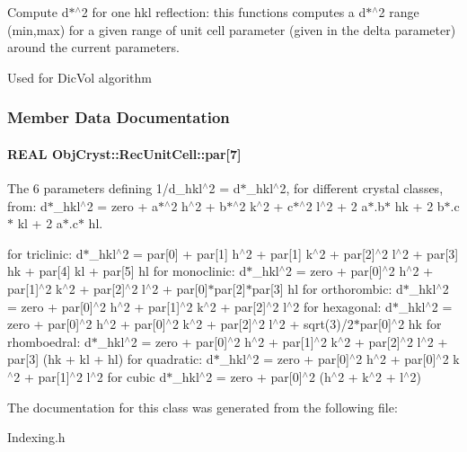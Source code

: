 \-Compute d$\ast$$^\wedge$2 for one hkl reflection\-: this functions computes a d$\ast$$^\wedge$2 range (min,max) for a given range of unit cell parameter (given in the delta parameter) around the current parameters. 

\-Used for \-Dic\-Vol algorithm 

\subsubsection{\-Member \-Data \-Documentation}
\paragraph[{par}]{\setlength{\rightskip}{0pt plus 5cm}\-R\-E\-A\-L {\bf \-Obj\-Cryst\-::\-Rec\-Unit\-Cell\-::par}[7]}\label{a00070_a624fa31d8c012440df7a3d7637dae182}


\-The 6 parameters defining 1/d\-\_\-hkl$^\wedge$2 = d$\ast$\-\_\-hkl$^\wedge$2, for different crystal classes, from\-: d$\ast$\-\_\-hkl$^\wedge$2 = zero + a$\ast$$^\wedge$2 h$^\wedge$2 + b$\ast$$^\wedge$2 k$^\wedge$2 + c$\ast$$^\wedge$2 l$^\wedge$2 + 2 a$\ast$.b$\ast$ hk + 2 b$\ast$.c$\ast$ kl + 2 a$\ast$.c$\ast$ hl. 

for triclinic\-: d$\ast$\-\_\-hkl$^\wedge$2 = par[0] + par[1] h$^\wedge$2 + par[1] k$^\wedge$2 + par[2]$^\wedge$2 l$^\wedge$2 + par[3] hk + par[4] kl + par[5] hl for monoclinic\-: d$\ast$\-\_\-hkl$^\wedge$2 = zero + par[0]$^\wedge$2 h$^\wedge$2 + par[1]$^\wedge$2 k$^\wedge$2 + par[2]$^\wedge$2 l$^\wedge$2 + par[0]$\ast$par[2]$\ast$par[3] hl for orthorombic\-: d$\ast$\-\_\-hkl$^\wedge$2 = zero + par[0]$^\wedge$2 h$^\wedge$2 + par[1]$^\wedge$2 k$^\wedge$2 + par[2]$^\wedge$2 l$^\wedge$2 for hexagonal\-: d$\ast$\-\_\-hkl$^\wedge$2 = zero + par[0]$^\wedge$2 h$^\wedge$2 + par[0]$^\wedge$2 k$^\wedge$2 + par[2]$^\wedge$2 l$^\wedge$2 + sqrt(3)/2$\ast$par[0]$^\wedge$2 hk for rhomboedral\-: d$\ast$\-\_\-hkl$^\wedge$2 = zero + par[0]$^\wedge$2 h$^\wedge$2 + par[1]$^\wedge$2 k$^\wedge$2 + par[2]$^\wedge$2 l$^\wedge$2 + par[3] (hk + kl + hl) for quadratic\-: d$\ast$\-\_\-hkl$^\wedge$2 = zero + par[0]$^\wedge$2 h$^\wedge$2 + par[0]$^\wedge$2 k$^\wedge$2 + par[1]$^\wedge$2 l$^\wedge$2 for cubic d$\ast$\-\_\-hkl$^\wedge$2 = zero + par[0]$^\wedge$2 (h$^\wedge$2 + k$^\wedge$2 + l$^\wedge$2) 

\-The documentation for this class was generated from the following file\-:\begin{DoxyCompactItemize}
\item 
\-Indexing.\-h\end{DoxyCompactItemize}
